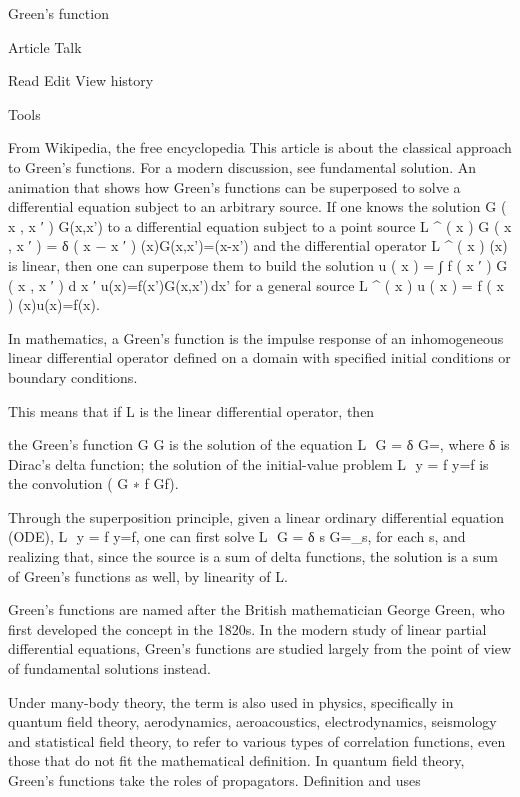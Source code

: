 Green's function

Article
Talk

Read
Edit
View history

Tools

From Wikipedia, the free encyclopedia
This article is about the classical approach to Green's functions. For a modern discussion, see fundamental solution.
An animation that shows how Green's functions can be superposed to solve a differential equation subject to an arbitrary source.
If one knows the solution G ( x , x ′ ) {\textstyle G(x,x')} to a differential equation subject to a point source L ^ ( x ) G ( x , x ′ ) = δ ( x − x ′ ) {(x)G(x,x')=\delta (x-x')} and the differential operator L ^ ( x ) {(x)} is linear, then one can superpose them to build the solution u ( x ) = ∫ f ( x ′ ) G ( x , x ′ ) d x ′ {\textstyle u(x)=\int f(x')G(x,x')\,dx'} for a general source L ^ ( x ) u ( x ) = f ( x ) {(x)u(x)=f(x)}.

In mathematics, a Green's function is the impulse response of an inhomogeneous linear differential operator defined on a domain with specified initial conditions or boundary conditions.

This means that if L {\displaystyle {} } is the linear differential operator, then

the Green's function G G is the solution of the equation L ⁡ G = δ {\displaystyle {} G=\delta }, where δ \delta is Dirac's delta function;
the solution of the initial-value problem L ⁡ y = f {\displaystyle {} y=f} is the convolution ( G ∗ f {\displaystyle G\ast f}).

Through the superposition principle, given a linear ordinary differential equation (ODE), L ⁡ y = f {\displaystyle {} y=f}, one can first solve L ⁡ G = δ s {\displaystyle {} G=\delta _{s}}, for each s, and realizing that, since the source is a sum of delta functions, the solution is a sum of Green's functions as well, by linearity of L.

Green's functions are named after the British mathematician George Green, who first developed the concept in the 1820s. In the modern study of linear partial differential equations, Green's functions are studied largely from the point of view of fundamental solutions instead.

Under many-body theory, the term is also used in physics, specifically in quantum field theory, aerodynamics, aeroacoustics, electrodynamics, seismology and statistical field theory, to refer to various types of correlation functions, even those that do not fit the mathematical definition. In quantum field theory, Green's functions take the roles of propagators.
Definition and uses

